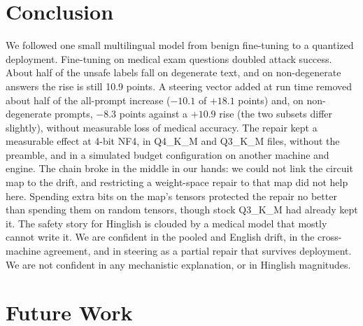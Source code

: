 \section{Conclusion}\label{sec:conclusion}
We followed one small multilingual model from benign fine-tuning to a quantized deployment. Fine-tuning on medical exam questions doubled attack success. About half of the unsafe labels fall on degenerate text, and on non-degenerate answers the rise is still 10.9 points. A steering vector added at run time removed about half of the all-prompt increase ($-10.1$ of $+18.1$ points) and, on non-degenerate prompts, $-8.3$ points against a $+10.9$ rise (the two subsets differ slightly), without measurable loss of medical accuracy. The repair kept a measurable effect at 4-bit NF4, in Q4\_K\_M and Q3\_K\_M files, without the preamble, and in a simulated budget configuration on another machine and engine. The chain broke in the middle in our hands: we could not link the circuit map to the drift, and restricting a weight-space repair to that map did not help here. Spending extra bits on the map's tensors protected the repair no better than spending them on random tensors, though stock Q3\_K\_M had already kept it. The safety story for Hinglish is clouded by a medical model that mostly cannot write it. We are confident in the pooled and English drift, in the cross-machine agreement, and in steering as a partial repair that survives deployment. We are not confident in any mechanistic explanation, or in Hinglish magnitudes.

\section{Future Work}\label{sec:future}
